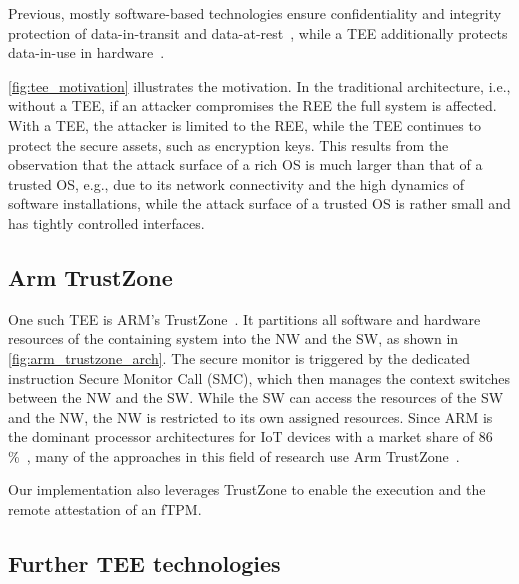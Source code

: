 
Previous, mostly software-based technologies ensure confidentiality and integrity protection of data-in-transit and data-at-rest~\cite{Pecholt2022}, while a \ac{TEE} additionally protects data-in-use in hardware~\cite{Pecholt2022, Lee:EECS-2022-96}.


\autoref{fig:tee_motivation} illustrates the motivation. In the traditional architecture, i.e., without a TEE, if an attacker compromises the \ac{REE} the full system is affected. With a \ac{TEE}, the attacker is limited to the \ac{REE}, while the \ac{TEE} continues to protect the secure assets, such as encryption keys. This results from the observation that the attack surface of a rich OS is much larger than that of a trusted OS, e.g., due to its network connectivity and the high dynamics of software installations, while the attack surface of a trusted OS is rather small and has tightly controlled interfaces.



\subsection{Arm TrustZone}

One such \ac{TEE} is ARM's TrustZone~\cite{ARM09, Ngabonziza2016}. It partitions all software and hardware resources of the containing system into the \ac{NW} and the \ac{SW}, as shown in \autoref{fig:arm_trustzone_arch}. The secure monitor is triggered by the dedicated instruction Secure Monitor Call (SMC), which then manages the context switches between the \ac{NW} and the \ac{SW}.
While the \ac{SW} can access the resources of the \ac{SW} and the \ac{NW}, the \ac{NW} is restricted to its own assigned resources.
Since ARM is the dominant processor architectures for IoT devices with a market share of 86\,\%~\cite{eclipse}, many of the approaches in this field of research use Arm TrustZone~\cite{Valadares2021}.



Our implementation also leverages TrustZone to enable the execution and the remote attestation of an fTPM\@.

\subsection{Further TEE technologies}

